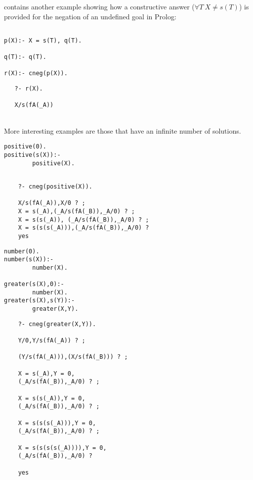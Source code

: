\documentclass{llncs}
\begin{document}
\cite{Stuckey95} contains another example showing how a constructive
answer ($\forall T ~ X \neq s(T)$) is provided for the negation of an
undefined goal in Prolog:

\begin{minipage}{2in}
\begin{verbatim}

p(X):- X = s(T), q(T).

q(T):- q(T).

r(X):- cneg(p(X)).
\end{verbatim}
\end{minipage}
\begin{minipage}{2in}
\begin{verbatim} 
   ?- r(X).

   X/s(fA(_A))

\end{verbatim} 
\end{minipage}\\



More interesting examples are those that have an infinite number of
solutions.

\begin{minipage}{1.5in}
\begin{verbatim}
positive(0). 
positive(s(X)):-
        positive(X).  
\end{verbatim}
\end{minipage} 
\begin{minipage}{2.5in}
\begin{verbatim} 

    ?- cneg(positive(X)).

    X/s(fA(_A)),X/0 ? ;
    X = s(_A),(_A/s(fA(_B)),_A/0) ? ;
    X = s(s(_A)), (_A/s(fA(_B)),_A/0) ? ;
    X = s(s(s(_A))),(_A/s(fA(_B)),_A/0) ? 
    yes
\end{verbatim} 
\end{minipage}

\begin{minipage}{1.5in}
\begin{verbatim}
number(0).
number(s(X)):-
        number(X).

greater(s(X),0):-
        number(X).
greater(s(X),s(Y)):-
        greater(X,Y).
\end{verbatim}
\end{minipage}
\begin{minipage}{2.5in}
\begin{verbatim} 
    ?- cneg(greater(X,Y)).

    Y/0,Y/s(fA(_A)) ? ;

    (Y/s(fA(_A))),(X/s(fA(_B))) ? ;

    X = s(_A),Y = 0,
    (_A/s(fA(_B)),_A/0) ? ;

    X = s(s(_A)),Y = 0,
    (_A/s(fA(_B)),_A/0) ? ;

    X = s(s(s(_A))),Y = 0,
    (_A/s(fA(_B)),_A/0) ? ;

    X = s(s(s(s(_A)))),Y = 0,
    (_A/s(fA(_B)),_A/0) ? 

    yes
\end{verbatim} 
\end{minipage}
\end{document}

